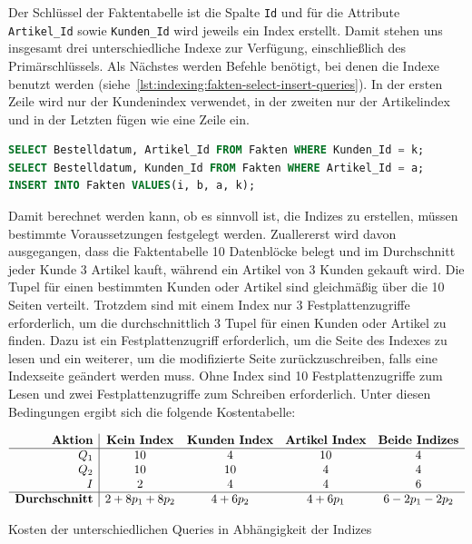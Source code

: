 Der Schlüssel der Faktentabelle ist die Spalte \texttt{Id} und für die Attribute \texttt{Artikel\_Id} sowie \texttt{Kunden\_Id} wird jeweils ein Index erstellt.
Damit stehen uns insgesamt drei unterschiedliche Indexe zur Verfügung, einschließlich des Primärschlüssels.
Als Nächstes werden Befehle benötigt, bei denen die Indexe benutzt werden (siehe~\ref{lst:indexing:fakten-select-insert-queries}).
In der ersten Zeile wird nur der Kundenindex verwendet, in der zweiten nur der Artikelindex und in der Letzten fügen wie eine Zeile ein.

\vspace{-12pt}
\begin{lstlisting}[language=SQL,caption=Select-Queries für die Faktentabelle,label={lst:indexing:fakten-select-insert-queries}]
SELECT Bestelldatum, Artikel_Id FROM Fakten WHERE Kunden_Id = k;
SELECT Bestelldatum, Kunden_Id FROM Fakten WHERE Artikel_Id = a;
INSERT INTO Fakten VALUES(i, b, a, k);
\end{lstlisting}
\vspace{-8pt}

Damit berechnet werden kann, ob es sinnvoll ist, die Indizes zu erstellen, müssen bestimmte Voraussetzungen festgelegt werden.
Zuallererst wird davon ausgegangen, dass die Faktentabelle 10 Datenblöcke belegt und im Durchschnitt jeder Kunde 3 Artikel kauft, während ein Artikel von 3 Kunden gekauft wird.
Die Tupel für einen bestimmten Kunden oder Artikel sind gleichmäßig über die 10 Seiten verteilt.
Trotzdem sind mit einem Index nur 3 Festplattenzugriffe erforderlich, um die durchschnittlich 3 Tupel für einen Kunden oder Artikel zu finden.
Dazu ist ein Festplattenzugriff erforderlich, um die Seite des Indexes zu lesen und ein weiterer, um die modifizierte Seite zurückzuschreiben, falls eine Indexseite geändert werden muss.
Ohne Index sind 10 Festplattenzugriffe zum Lesen und zwei Festplattenzugriffe zum Schreiben erforderlich.
Unter diesen Bedingungen ergibt sich die folgende Kostentabelle:

\vspace{-18pt}
\begin{table}[H]
    \centering
    \setlength{\arrayrulewidth}{0.4mm}
    \[
        \begin{array}{r|c c c c}
            \textbf{Aktion} & \textbf{Kein Index} & \textbf{Kunden Index} & \textbf{Artikel Index} & \textbf{Beide Indizes} \\ \hline
            Q_1 & 10 & 4 & 10 & 4 \\
            Q_2 & 10 & 10 & 4 & 4 \\
            I   & 2  & 4  & 4  & 6 \\ \hline
            \textbf{Durchschnitt} & 2 + 8p_1 + 8p_2 & 4 + 6p_2 & 4 + 6p_1 & 6-2p_1-2p_2 \\
        \end{array}
    \]
    \vspace{-5pt}
    \caption[Performance-Vergleich]{Kosten der unterschiedlichen Queries in Abhängigkeit der Indizes}
    \label{tab:performance-queries}
\end{table}
\vspace{-25pt}

